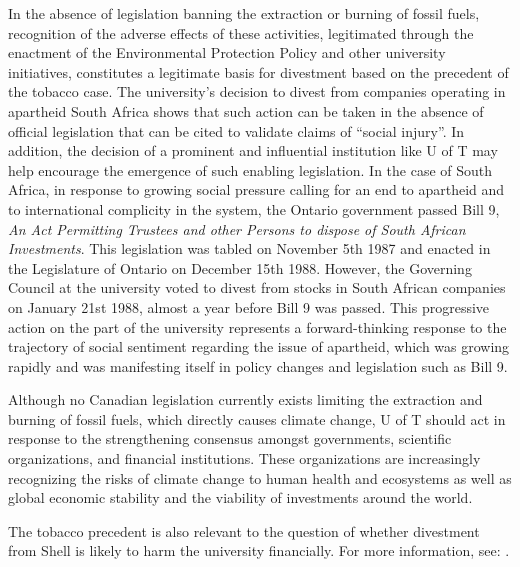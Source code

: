 \documentclass[10pt]{article}
\begin{document}
In the absence of legislation banning the extraction or burning of fossil fuels, recognition of the adverse effects of these activities, legitimated through the enactment of the Environmental Protection Policy and other university initiatives, constitutes a legitimate basis for divestment based on the precedent of the tobacco case.  
The university's decision to divest from companies operating in apartheid South Africa shows that such action can be taken in the absence of official legislation that can be cited to validate claims of ``social injury''.
In addition, the decision of a prominent and influential institution like U of T may help encourage the emergence of such enabling legislation.
In the case of South Africa, in response to growing social pressure calling for an end to apartheid and to international complicity in the system, the Ontario government passed Bill 9, \emph{An Act Permitting Trustees and other Persons to dispose of South African Investments}.
This legislation was tabled on November 5th 1987 and enacted in the Legislature of Ontario on December 15th 1988. 
However, the Governing Council at the university voted to divest from stocks in South African companies on January 21st 1988, almost a year before Bill 9 was passed. 
This progressive action on the part of the university represents a forward-thinking response to the trajectory of social sentiment regarding the issue of apartheid, which was growing rapidly and was manifesting itself in policy changes and legislation such as Bill 9. 



Although no Canadian legislation currently exists limiting the extraction and burning of fossil fuels, which directly causes climate change, U of T should act in response to the strengthening consensus amongst governments, scientific organizations, and financial institutions. These organizations are increasingly recognizing the risks of climate change to human health and ecosystems as well as global economic stability and the viability of investments around the world.



The tobacco precedent is also relevant to the question of whether divestment from Shell is likely to harm the university financially. For more information, see: .






\end{document}
